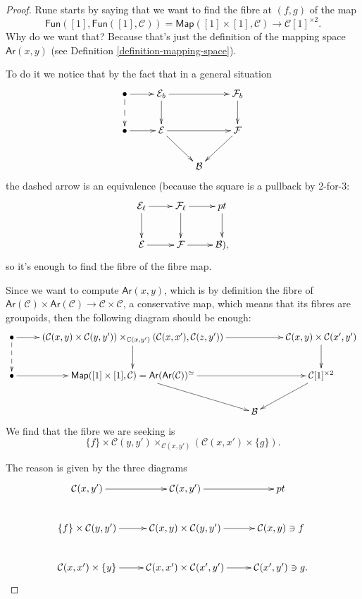 \begin{proof}
Rune starts by saying that we want to find
the fibre at $(f,g)$ of the map
$$
\mathsf{Fun}([1],\mathsf{Fun}([1],\mathcal{C}
))=
\mathsf{Map}([1]\times[1],\mathcal{C})
\to\mathcal{C}[1]^{\times
2}.
$$
Why do we want that? Because that's just the
definition
of the mapping space $\mathsf{Ar}(x,y)$
(see Definition
\ref{definition-mapping-space}).

To do it we notice that by the fact that in a
general situation
$$
\xymatrix{
\bullet\ar@{-->}[d]\ar[r]&\mathcal{E}_b\ar[d]
\ar[rr]&&
\mathcal{F}_b\ar[d]\\
\bullet \ar[r]&\mathcal{E} \ar[rd] \ar[rr] &&
\mathcal{F} \ar[dl] \\
&& \mathcal{B}
}
$$
the dashed arrow is
an equivalence (because the square is a
pullback
by 2-for-3:
$$
\xymatrix{
\mathcal{E}_\ell\ar[r]\ar[d]&\mathcal{F}
_\ell\ar[d]\ar[r]&pt\ar[d]\\
\mathcal{E}\ar[r]&\mathcal{F}\ar[r]&
\mathcal{B}),
}
$$
so it's enough to find the fibre of the fibre
map.

Since we want to compute $\mathsf{Ar}(x,y)$,
which is by definition the fibre of
$\mathsf{Ar}(\mathcal{C})\times\mathsf{Ar}
(\mathcal{C})
\to \mathcal{C}\times\mathcal{C}$, a
conservative map,
which means that its fibres are groupoids,
then the following diagram should be enough:
$$
\xymatrix{
\bullet\ar@{-->}[d]\ar[r]
&(\mathcal{C}(x,y)\times\mathcal{C}(y,y'))
\times
_{\mathbb{C}(x,y')}
(\mathcal{C}(x,x'),\mathcal{C}(z,y'))
\ar[d]\ar[rr]
&& \mathcal{C}(x,y)\times
\mathcal{C}(x',y')\ar[d]\\
\bullet \ar[r]
&\mathsf{Map}([1]\times[1],\mathcal{C})
=\mathsf{Ar}(\mathsf{Ar}(\mathcal{C}))^\simeq
\ar[rd] \ar[rr]
&&\mathcal{C}[1]^{\times 2}\ar[dl] \\
&& \mathcal{B}
}
$$
We find that the fibre we are seeking is
\begin{equation}
\label{equation-fibre}
\{f\}\times\mathcal{C}(y,y')
\times_{\mathcal{C}(x,y')}
(\mathcal{C}(x,x')\times \{g\}).
\end{equation}

\noindent
The reason is given by the three diagrams
$$
\xymatrix{
\mathcal{C}(x,y')\ar[r]
&\mathcal{C}(x,y')\ar[r]
&pt\\
\{f\}\times\mathcal{C}(y,y')\ar[r]
&\mathcal{C}(x,y)\times\mathcal{C}(y,y')
\ar[r]
&\mathcal{C}(x,y)\ni f\\
\mathcal{C}(x,x')\times\{y\}\ar[r]
&\mathcal{C}(x,x')\times\mathcal{C}(x',y')
\ar[r]
&\mathcal{C}(x',y')\ni g.
}
$$
\end{proof}

